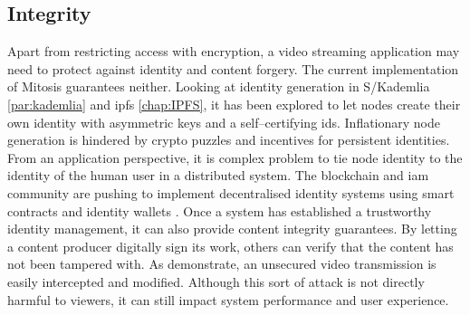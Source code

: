 \subsection{Integrity}\label{sec:security-integrity}
Apart from restricting access with encryption, a video streaming application may need to protect against identity and content forgery. The current implementation of Mitosis guarantees neither. Looking at identity generation in S/Kademlia \vref{par:kademlia} and \gls{ipfs} \vref{chap:IPFS}, it has been explored to let nodes create their own identity with asymmetric keys and a self–certifying ids. Inflationary node generation is hindered by crypto puzzles and incentives for persistent identities. From an application perspective, it is complex problem to tie node identity to the identity of the human user in a distributed system. The blockchain and \gls{iam} community are pushing to implement decentralised identity systems using smart contracts \cite{eth-identity} and identity wallets \cite{gartner-iam}.
Once a system has established a trustworthy identity management, it can also provide content integrity guarantees. By letting a content producer digitally sign its work, others can verify that the content has not been tampered with. As \citet[\S7]{anatomy-personalized-livestreaming} demonstrate, an unsecured video transmission is easily intercepted and modified. Although this sort of attack is not directly harmful to viewers, it can still impact system performance and user experience.

